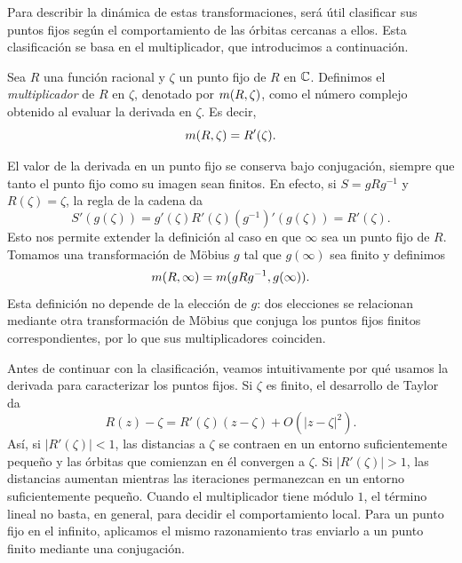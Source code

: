 Para describir la dinámica de estas transformaciones, será útil clasificar sus
puntos fijos según el comportamiento de las órbitas cercanas a ellos. Esta
clasificación se basa en el multiplicador, que introducimos a continuación.

\begin{definicion}
  Sea $R$ una función racional y $\zeta$ un punto fijo de $R$ en $\mathbb{C}$.
  Definimos el \emph{multiplicador} de $R$ en $\zeta$, denotado por
  $m({R}, {\zeta})$, como el número complejo obtenido al evaluar la
  derivada en $\zeta$. Es decir,
  \begin{equation*}
    m({R}, {\zeta}) = R'(\zeta).
  \end{equation*}
\end{definicion}

El valor de la derivada en un punto fijo se conserva bajo conjugación, siempre
que tanto el punto fijo como su imagen sean finitos. En efecto, si $S = g R
g^{-1}$ y $R(\zeta) = \zeta$, la regla de la cadena da
\begin{equation*}
  S'(g(\zeta)) = g'(\zeta) R'(\zeta) (g^{-1})'(g(\zeta)) = R'(\zeta).
\end{equation*}
Esto nos permite extender la definición al caso en que $\infty$ sea un punto
fijo de $R$. Tomamos una transformación de Möbius $g$ tal que $g(\infty)$ sea
finito y definimos
\begin{equation*}
  m({R}, {\infty}) = m({g R g^{-1}}, {g(\infty)}).
\end{equation*}
Esta definición no depende de la elección de $g$: dos elecciones se relacionan
mediante otra transformación de Möbius que conjuga los puntos fijos finitos
correspondientes, por lo que sus multiplicadores coinciden.

Antes de continuar con la clasificación, veamos intuitivamente por qué usamos
la derivada para caracterizar los puntos fijos. Si $\zeta$ es finito, el
desarrollo de Taylor da
\begin{equation*}
  R(z)-\zeta = R'(\zeta)(z-\zeta) + O(|z-\zeta|^2).
\end{equation*}
Así, si $|R'(\zeta)| < 1$, las distancias a $\zeta$ se contraen en un entorno
suficientemente pequeño y las órbitas que comienzan en él convergen a $\zeta$.
Si $|R'(\zeta)| > 1$, las distancias aumentan mientras las iteraciones
permanezcan en un entorno suficientemente pequeño. Cuando el multiplicador
tiene módulo $1$, el término lineal no basta, en general, para decidir el
comportamiento local. Para un punto fijo en el infinito, aplicamos el mismo
razonamiento tras enviarlo a un punto finito mediante una conjugación.

